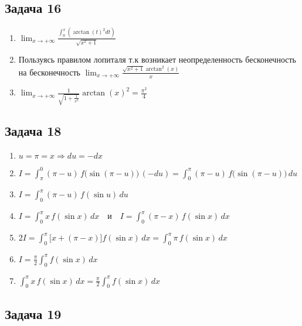 \documentclass[a4paper,12pt]{article}
\begin{document}
\subsection{Задача 16}
\begin{enumerate}
    \item $\lim_{x \to +\infty} \frac{\int_{0}^{x} (\arctan(t)^2 dt)}{\sqrt{x^2+1}}$
    \item Пользуясь правилом лопиталя т.к возникает неопределенность бесконечность на бесконечность $\lim_{x \to +\infty} \frac{\sqrt{x^2+1}\arctan^2(x)}{x}$
    \item $\lim_{x \to +\infty} \frac{1}{\sqrt{1+\frac{1}{x^2}}}\arctan(x)^2 = \frac{\pi^2}{4}$
\end{enumerate}

\subsection{Задача 18}
\begin{enumerate}
    \item $u = \pi = x \Rightarrow du = -dx$
    \item $I = \int_\pi^0 (\pi - u)\, f\bigl(\sin(\pi - u)\bigr)\,(-du) = \int_0^\pi (\pi - u)\, f\bigl(\sin(\pi - u)\bigr)\,du$
    \item $I = \int_0^\pi (\pi - u)\, f(\sin u)\,du$
    \item $I = \int_0^\pi x\, f(\sin x)\,dx \quad \text{и} \quad I = \int_0^\pi (\pi - x)\, f(\sin x)\,dx$
    \item $2I = \int_0^\pi \bigl[x + (\pi - x)\bigr] f(\sin x)\,dx = \int_0^\pi \pi\, f(\sin x)\,dx$
    \item $I = \frac{\pi}{2} \int_0^\pi f(\sin x)\,dx$
    \item $\int_0^\pi x\, f(\sin x)\,dx = \frac{\pi}{2} \int_0^\pi f(\sin x)\,dx$
\end{enumerate}

\subsection{Задача 19}
\end{document}
